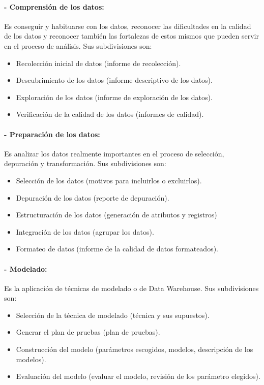 \documentclass[twoside,twocolumn]{article}
\begin{document}
\paragraph{- Comprensión de los datos:}
Es conseguir y habituarse con los datos, 
reconocer las dificultades en la calidad de los datos y reconocer también 
las fortalezas de estos mismos que pueden servir en el proceso de 
análisis. Sus subdivisiones son: 

\begin{itemize}
    \item Recolección inicial de datos (informe de recolección). 
    \item Descubrimiento de los datos (informe descriptivo de los datos).
    \item Exploración de los datos (informe de exploración de los datos).
    \item Verificación de la calidad de los datos (informes de calidad). 
    
\end{itemize}

\paragraph{- Preparación de los datos:}
Es analizar los datos realmente importantes 
en el proceso de selección, depuración y transformación. Sus 
subdivisiones son: 
\begin{itemize}
    \item Selección de los datos (motivos para incluirlos o excluirlos). 
    \item Depuración de los datos (reporte de depuración).
    \item Estructuración de los datos (generación de atributos y registros)
    \item Integración de los datos (agrupar los datos).
    \item Formateo de datos (informe de la calidad de datos formateados).
\end{itemize}

\paragraph{- Modelado:}
Es la aplicación de técnicas de modelado o de Data 
Warehouse. Sus subdivisiones son: 

\begin{itemize}
    \item Selección de la técnica de modelado (técnica y sus supuestos). 
    \item Generar el plan de pruebas (plan de pruebas). 
    \item Construcción del modelo (parámetros escogidos, modelos, descripción de los modelos). 
    \item Evaluación del modelo (evaluar el modelo, revisión de los parámetro elegidos). 
\end{itemize}
\end{document}
